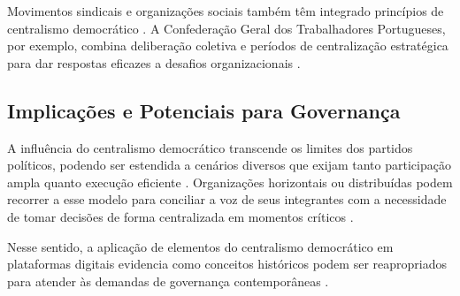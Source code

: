 Movimentos sindicais e organizações sociais também
têm integrado princípios de centralismo democrático \cite{CGTPStatutes}. A
Confederação Geral dos Trabalhadores Portugueses, por exemplo,
combina deliberação coletiva e períodos de centralização estratégica
para dar respostas eficazes a desafios organizacionais \cite{CGTPStatutes}.

\subsection{Implicações e Potenciais para Governança}
\label{sec:implicacoes_potenciais}

A influência do centralismo democrático transcende os limites dos
partidos políticos, podendo ser estendida a cenários diversos que
exijam tanto participação ampla quanto execução eficiente
\cite{ACenturyofDemocraticCentralism, TheCostsofConnection}.
Organizações horizontais ou distribuídas podem recorrer a esse modelo
para conciliar a voz de seus integrantes com a necessidade de tomar
decisões de forma centralizada em momentos críticos
\cite{StillaCenturyoftheChineseModel,ACenturyofDemocraticCentralism}.

Nesse sentido, a aplicação de elementos do centralismo democrático em
plataformas digitais evidencia como conceitos históricos podem ser
reapropriados para atender às demandas de governança contemporâneas \cite{Colbac}.